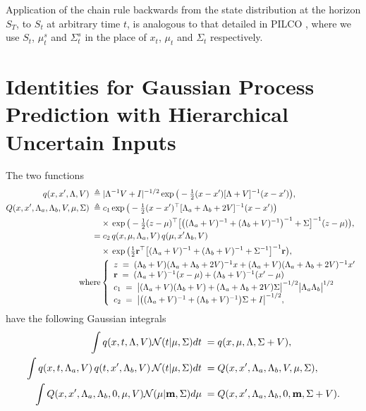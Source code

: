 \documentclass{article}
\newcommand{\pno}[1]{#1_{t|t-1}}   %
\newcommand{\now}[1]{#1_t}
\newcommand{\bfm}{{\bf m}}
\begin{document}
Application of the chain rule backwards from the state distribution at the horizon $S_T$,
to $S_t$ at arbitrary time $t$,
is analogous to that detailed in
PILCO \cite{pilco},
where we use $\now{S}$, $\now{\mu}^s$ and $\now{\Sigma}^s$ in the place of
$\now{x}$, $\now{\mu}$ and $\now{\Sigma}$ respectively.

\section{Identities for Gaussian Process
Prediction with Hierarchical Uncertain Inputs}

The two functions
\begin{equation}
\begin{split}
q(x,x',\Lambda,V)\;\triangleq&\;|\Lambda^{-1}V+I|^{-1/2}\exp\big(-\tfrac{1}{2}(x-x')[\Lambda+V]^{-1}(x-x')\big),\\
Q(x,x',\Lambda_a,\Lambda_b,V, \mu, \Sigma)\;\triangleq&\;
c_1\exp\big(-\tfrac{1}{2}(x-x')^\top[\Lambda_a+\Lambda_b+2V]^{-1}(x-x')\big)\\
&\times\,\exp\big(-\tfrac{1}{2}(z-\mu)^\top\big[\big((\Lambda_a+V)^{-1}+(\Lambda_b+V)^{-1}\big)^{-1}+\Sigma\big]^{-1}(z-\mu)\big),\\
=&\;c_2\,q(x,\mu,\Lambda_a,V)\,q(\mu,x'\Lambda_b,V)\\
&\times\,\exp\big(\tfrac{1}{2}{\bf
  r}^\top\big[(\Lambda_a+V)^{-1}+(\Lambda_b+V)^{-1}+\Sigma^{-1}\big]^{-1}{\bf r}\big),\\
\text{where}&\left\{\begin{array}{l}
z\;=\;(\Lambda_b+V)(\Lambda_a+\Lambda_b+2V)^{-1}x+(\Lambda_a+V)(\Lambda_a+\Lambda_b+2V)^{-1}x'\\
{\bf r}\;=\;(\Lambda_a+V)^{-1}(x-\mu)+(\Lambda_b+V)^{-1}(x'-\mu)\\
c_1\;=\;\big|(\Lambda_a+V)(\Lambda_b+V)+(\Lambda_a+\Lambda_b+2V)\Sigma\big|^{-1/2}\big|\Lambda_a\Lambda_b\big|^{1/2}\;\\
c_2\;=\;\big|\big((\Lambda_a+V)^{-1}+(\Lambda_b+V)^{-1}\big)\Sigma+I\big|^{-1/2},\end{array}\right.
\end{split}
\end{equation}
have the following Gaussian integrals
\begin{equation}
\begin{split}
\int q(x,t,\Lambda,V){\cal N}(t|\mu,\Sigma)dt\;=&\;q(x,\mu,\Lambda,\Sigma+V),\\
\int q(x,t,\Lambda_a,V)\,q(t,x',\Lambda_b,V)\,{\cal
  N}(t|\mu,\Sigma)dt\;=&\;Q(x,x',\Lambda_a,\Lambda_b,V,\mu,\Sigma),\\
\int Q(x,x',\Lambda_a,\Lambda_b,0,\mu,V){\cal N}(\mu|\bfm,\Sigma)d\mu\;=&\;Q(x,x',\Lambda_a,\Lambda_b,0,\bfm,\Sigma+V).
\end{split}
\end{equation}
\end{document}
